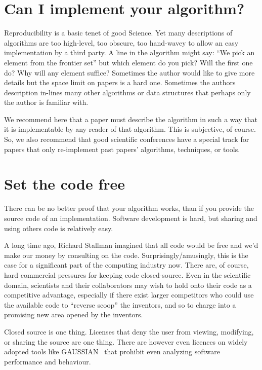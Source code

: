 \documentclass[conference]{IEEEtran}
\begin{document}
\section{Can I implement your algorithm?}

Reproducibility is a basic tenet of good Science. Yet many
descriptions of algorithms are too high-level, too obscure, too
hand-wavey to allow an easy implementation by a third party. A line in
the algorithm might say: ``We pick an element from the frontier set''
but which element do you pick? Will the first one do? Why will any
element suffice? Sometimes the author would like to give more details
but the space limit on papers is a hard one. Sometimes the authors
description in-lines many other algorithms or data structures that
perhaps only the author is familiar with.

We recommend here that a paper must describe the algorithm in such a
way that it is implementable by any reader of that algorithm. This is
subjective, of course. So, we also recommend that good scientific
conferences have a special track for papers that only re-implement
past papers' algorithms, techniques, or tools.


\section{Set the code free} 

There can be no better proof that your algorithm works, than if you
provide the source code of an implementation. Software development is
hard, but sharing and using others code is relatively easy.

A long time ago, Richard Stallman imagined that all code would be free
and we'd make our money by consulting on the code.
Surprisingly/amusingly, this is the case for a significant part of the
computing industry now. There are, of course, hard commercial
pressures for keeping code closed-source. Even in the scientific
domain, scientists and their collaborators may wish to hold onto their
code as a competitive advantage, especially if there exist larger
competitors who could use the available code to ``reverse scoop'' the
inventors, and so to charge into a promising new area opened by the
inventors.

Closed source is one thing. Licenses that deny the user from viewing,
modifying, or sharing the source are one thing. There are however even
licences on widely adopted tools like GAUSSIAN~\cite{Giles2004} that
prohibit even analyzing software performance and behaviour.
 
\end{document}
